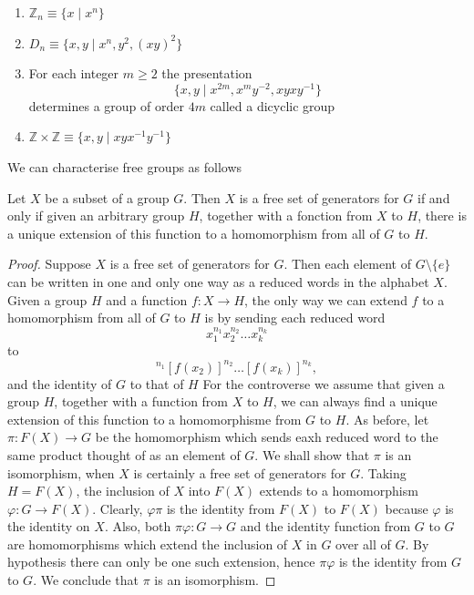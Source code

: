 \begin{exemple}
    \begin{enumerate}
        \item $\mathbb{Z}_n\equiv \{x\mid x^n\}$
        \item $D_n\equiv \{x,y\mid x^n,y^2,(xy)^2\}$
        \item For each integer $m\geq 2$ the presentation
        \begin{equation*}
            \{x,y\mid x^{2m},x^my^{-2},xyxy^{-1}\}
        \end{equation*}
        determines a group of order $4m$ called a dicyclic group
        \item $\mathbb{Z}\times\mathbb{Z}\equiv \{x,y\mid xyx^{-1}y^{-1}\}$
    \end{enumerate}
\end{exemple}
We can characterise free groups as follows
\begin{theoreme}
    Let $X$ be a subset of a group $G$. Then $X$ is a free set of generators for $G$ if and only if given an arbitrary group $H$, together with a fonction from $X$ to $H$, there is a unique extension of this function to a homomorphism from all of $G$ to $H$.
\end{theoreme}

\begin{proof}
    Suppose $X$ is a free set of generators for $G$. Then each element of $G\setminus\{e\}$ can be written in one and only one way as a reduced words in the alphabet $X$. Given a group $H$ and a function $f:X\to H$, the only way we can extend $f$ to a homomorphism from all of $G$ to $H$ is by sending each reduced word
    \begin{equation*}
        x_1^{n_1}x_2^{n_2}\dotsc x_k^{n_k}
    \end{equation*}
    to
    \begin{equation*}
        [f(x_1)]^{n_1}[f(x_2)]^{n_2}\dotsc [f(x_k)]^{n_k},
    \end{equation*}
    and the identity of $G$ to that of $H$
    For the controverse we assume that given a group $H$, together with a function from $X$ to $H$, we can always find a unique extension of this function to a homomorphisme from $G$ to $H$. As before, let $\pi:F(X)\to G$ be the homomorphism which sends eaxh reduced word to the same product thought of as an element of $G$. We shall show that $\pi$ is an isomorphism, when $X$ is certainly a free set of generators for $G$. Taking $H=F(X)$, the inclusion of $X$ into $F(X)$ extends to a homomorphism $\varphi:G\to F(X)$. Clearly, $\varphi\pi$ is the identity from $F(X)$ to $F(X)$ because $\varphi$ is the identity on $X$. Also, both $\pi\varphi:G\to G$ and the identity function from $G$ to $G$ are homomorphisms which extend the inclusion of $X$ in $G$ over all of $G$. By hypothesis there can only be one such extension, hence $\pi \varphi$ is the identity from $G$ to $G$. We conclude that $\pi$ is an isomorphism.
\end{proof}
